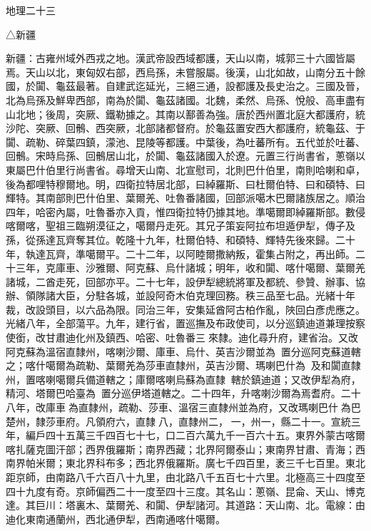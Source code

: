 
\begin{pinyinscope}
地理二十三

△新疆

新疆：古雍州域外西戎之地。漢武帝設西域都護，天山以南，城郭三十六國皆屬焉。天山以北，東匈奴右部，西烏孫，未嘗服屬。後漢，山北如故，山南分五十餘國，於闐、龜茲最著。自建武迄延光，三絕三通，設都護及長史治之。三國及晉，北為烏孫及鮮卑西部，南為於闐、龜茲諸國。北魏，柔然、烏孫、悅般、高車盡有山北地；後周，突厥、鐵勒據之。其南以鄯善為強。唐於西州置北庭大都護府，統沙陀、突厥、回鶻、西突厥，北部諸都督府。於龜茲置安西大都護府，統龜茲、于闐、疏勒、碎葉四鎮，濛池、昆陵等都護。中葉後，為吐蕃所有。五代並於吐蕃、回鶻。宋時烏孫、回鶻居山北，於闐、龜茲諸國入於遼。元置三行尚書省，蔥嶺以東屬巴什伯里行尚書省。尋增天山南、北宣慰司，北則巴什伯里，南則哈喇和卓，後為都哩特穆爾地。明，四衛拉特居北部，曰綽羅斯、曰杜爾伯特、曰和碩特、曰輝特。其南部則巴什伯里、葉爾羌、吐魯番諸國，回部派噶木巴爾諸族居之。順治四年，哈密內屬，吐魯番亦入貢，惟四衛拉特仍據其地。準噶爾即綽羅斯部。數侵喀爾喀，聖祖三臨朔漠征之，噶爾丹走死。其兄子策妄阿拉布坦遁伊犁，傳子及孫，從孫達瓦齊奪其位。乾隆十九年，杜爾伯特、和碩特、輝特先後來歸。二十年，執達瓦齊，準噶爾平。二十二年，以阿睦爾撒納叛，霍集占附之，再出師。二十三年，克庫車、沙雅爾、阿克蘇、烏什諸城；明年，收和闐、喀什噶爾、葉爾羌諸城，二酋走死，回部亦平。二十七年，設伊犁總統將軍及都統、參贊、辦事、協辦、領隊諸大臣，分駐各城，並設阿奇木伯克理回務。秩三品至七品。光緒十年裁，改設頭目，以六品為限。同治三年，安集延酋阿古柏作亂，陜回白彥虎應之。光緒八年，全部蕩平。九年，建行省，置巡撫及布政使司，以分巡鎮迪道兼理按察使銜，改甘肅迪化州及鎮西、哈密、吐魯番三來隸。迪化尋升府，建省治。又改阿克蘇為溫宿直隸州，喀喇沙爾、庫車、烏什、英吉沙爾並為，置分巡阿克蘇道轄之；喀什噶爾為疏勒、葉爾羌為莎車直隸州，英吉沙爾、瑪喇巴什為，及和闐直隸州，置喀喇噶爾兵備道轄之；庫爾喀喇烏蘇為直隸，轄於鎮迪道；又改伊犁為府，精河、塔爾巴哈臺為，置分巡伊塔道轄之。二十四年，升喀喇沙爾為焉耆府。二十八年，改庫車為直隸州，疏勒、莎車、溫宿三直隸州並為府，又改瑪喇巴什為巴楚州，隸莎車府。凡領府六，直隸八，直隸州二，一，州一，縣二十一。宣統三年，編戶四十五萬三千四百七十七，口二百六萬九千一百六十五。東界外蒙古喀爾喀扎薩克圖汗部；西界俄羅斯；南界西藏；北界阿爾泰山；東南界甘肅、青海；西南界帕米爾；東北界科布多；西北界俄羅斯。廣七千四百里，袤三千七百里。東北距京師，由南路八千六百八十九里，由北路八千五百七十六里。北極高三十四度至四十九度有奇。京師偏西二十一度至四十三度。其名山：蔥嶺、昆侖、天山、博克達。其巨川：塔裏木、葉爾羌、和闐、伊犁諸河。其道路：天山南、北。電線：由迪化東南通蘭州，西北通伊犁，西南通喀什噶爾。


\end{pinyinscope}
